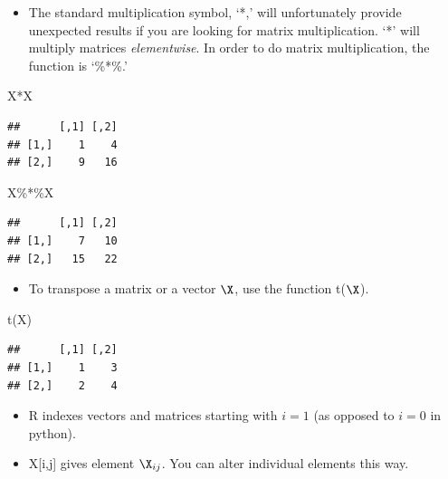 \documentclass[
]{article}
\newenvironment{Shaded}{\begin{snugshade}}{\end{snugshade}}
\newcommand{\FunctionTok}[1]{\textcolor[rgb]{0.00,0.00,0.00}{#1}}
\newcommand{\NormalTok}[1]{#1}
\newcommand{\SpecialCharTok}[1]{\textcolor[rgb]{0.00,0.00,0.00}{#1}}
\providecommand{\tightlist}{%
  \setlength{\itemsep}{0pt}\setlength{\parskip}{0pt}}
\theoremstyle{definition}
\theoremstyle{definition}
\theoremstyle{definition}
\theoremstyle{definition}
\theoremstyle{remark}
\begin{document}
\begin{itemize}
\tightlist
\item
  The standard multiplication symbol, `*,' will unfortunately provide unexpected results if you are looking for matrix multiplication. `*' will multiply matrices \emph{elementwise}. In order to do matrix multiplication, the function is `\%*\%.'
\end{itemize}

\begin{Shaded}
\begin{Highlighting}[]
\NormalTok{X}\SpecialCharTok{*}\NormalTok{X}
\end{Highlighting}
\end{Shaded}

\begin{verbatim}
##      [,1] [,2]
## [1,]    1    4
## [2,]    9   16
\end{verbatim}

\begin{Shaded}
\begin{Highlighting}[]
\NormalTok{X}\SpecialCharTok{\%*\%}\NormalTok{X}
\end{Highlighting}
\end{Shaded}

\begin{verbatim}
##      [,1] [,2]
## [1,]    7   10
## [2,]   15   22
\end{verbatim}

\begin{itemize}
\tightlist
\item
  To transpose a matrix or a vector \(\X\), use the function t(\(\X\)).
\end{itemize}

\begin{Shaded}
\begin{Highlighting}[]
\FunctionTok{t}\NormalTok{(X)}
\end{Highlighting}
\end{Shaded}

\begin{verbatim}
##      [,1] [,2]
## [1,]    1    3
## [2,]    2    4
\end{verbatim}

\begin{itemize}
\tightlist
\item
  R indexes vectors and matrices starting with \(i=1\) (as opposed to \(i=0\) in python).
\item
  X{[}i,j{]} gives element \(\X_{ij}\). You can alter individual elements this way.
\end{itemize}
\end{document}

